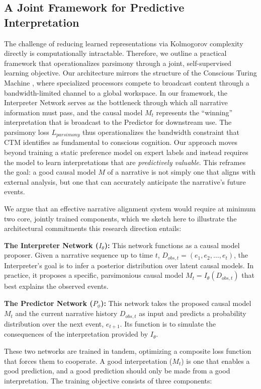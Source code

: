 \documentclass{article}
\theoremstyle{plain}
\theoremstyle{definition}
\theoremstyle{remark}
\begin{document}
\subsection{A Joint Framework for Predictive Interpretation}
\label{sec:joint}
The challenge of reducing learned representations via Kolmogorov complexity 
directly is computationally intractable. Therefore, we outline a practical 
framework that operationalizes parsimony through a joint, self-supervised 
learning objective. Our architecture mirrors the structure of the Conscious 
Turing Machine \cite{blum22, blum24}, where specialized processors compete to 
broadcast content through a bandwidth-limited channel to a global workspace. 
In our framework, the Interpreter Network serves as the bottleneck through 
which all narrative information must pass, and the causal model $M_t$ 
represents the ``winning'' interpretation that is broadcast to the Predictor 
for downstream use. The parsimony loss $L_{parsimony}$ thus operationalizes 
the bandwidth constraint that CTM identifies as fundamental to conscious 
cognition. Our approach moves beyond training a static preference model on 
expert labels and instead requires the model to learn interpretations that 
are \textit{predictively valuable}. This reframes the goal: a good causal 
model $M$ of a narrative is not simply one that aligns with external 
analysis, but one that can accurately anticipate the narrative's future 
events.

We argue that an effective narrative alignment system would require at minimum two core, jointly trained components, which we sketch here to illustrate the architectural commitments this research direction entails:

\textbf{The Interpreter Network ($I_\theta$):} This network functions as a causal model proposer. Given a narrative sequence up to time $t$, $D_{obs, t} = (e_1, e_2, \dots, e_t)$, the Interpreter's goal is to infer a posterior distribution over latent causal models. In practice, it proposes a specific, parsimonious causal model $M_t = I_\theta(D_{obs, t})$ that best explains the observed events.

\textbf{The Predictor Network ($P_\phi$):} This network takes the proposed causal model $M_t$ and the current narrative history $D_{obs, t}$ as input and predicts a probability distribution over the next event, $e_{t+1}$. Its function is to simulate the consequences of the interpretation provided by $I_\theta$.

These two networks are trained in tandem, optimizing a composite loss function that forces them to cooperate. A good interpretation ($M_t$) is one that enables a good prediction, and a good prediction should only be made from a good interpretation. The training objective consists of three components:
\end{document}
